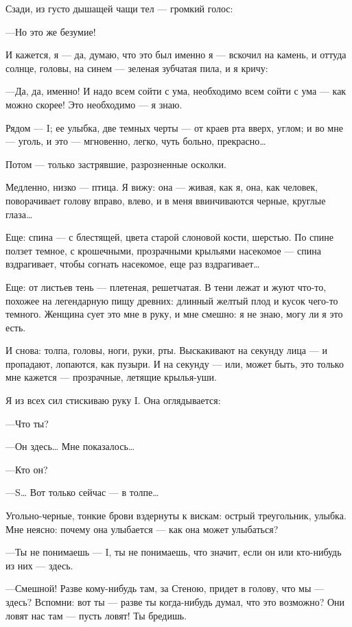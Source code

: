 \documentclass[11pt,openany]{book}
\begin{document}
Сзади, из густо дышащей чащи тел --- громкий голос:

---Но это же безумие!

И кажется, я --- да, думаю, что это был именно я --- вскочил на камень, и оттуда солнце, головы, на синем --- зеленая зубчатая пила, и я кричу:

---Да, да, именно! И надо всем сойти с ума, необходимо всем сойти с ума --- как можно скорее! Это необходимо --- я знаю.

Рядом --- I; ее улыбка, две темных черты --- от краев рта вверх, углом; и во мне --- уголь, и это --- мгновенно, легко, чуть больно, прекрасно\ldots{}

Потом --- только застрявшие, разрозненные осколки.

Медленно, низко --- птица. Я вижу: она --- живая, как я, она, как человек, поворачивает голову вправо, влево, и в меня ввинчиваются черные, круглые глаза\ldots{}

Еще: спина --- с блестящей, цвета старой слоновой кости, шерстью. По спине ползет темное, с крошечными, прозрачными крыльями насекомое --- спина вздрагивает, чтобы согнать насекомое, еще раз вздрагивает\ldots{}

Еще: от листьев тень --- плетеная, решетчатая. В тени лежат и жуют что-то, похожее на легендарную пищу древних: длинный желтый плод и кусок чего-то темного. Женщина сует это мне в руку, и мне смешно: я не знаю, могу ли я это есть.

И снова: толпа, головы, ноги, руки, рты. Выскакивают на секунду лица --- и пропадают, лопаются, как пузыри. И на секунду --- или, может быть, это только мне кажется --- прозрачные, летящие крылья-уши.

Я из всех сил стискиваю руку I. Она оглядывается:

---Что ты?

---Он здесь\ldots{} Мне показалось\ldots{}

---Кто он?

---S\ldots{} Вот только сейчас --- в толпе\ldots{}

Угольно-черные, тонкие брови вздернуты к вискам: острый треугольник, улыбка. Мне неясно: почему она улыбается --- как она может улыбаться?

---Ты не понимаешь --- I, ты не понимаешь, что значит, если он или кто-нибудь из них --- здесь.

---Смешной! Разве кому-нибудь там, за Стеною, придет в голову, что мы --- здесь? Вспомни: вот ты --- разве ты когда-нибудь думал, что это возможно? Они ловят нас там --- пусть ловят! Ты бредишь.
\end{document}
